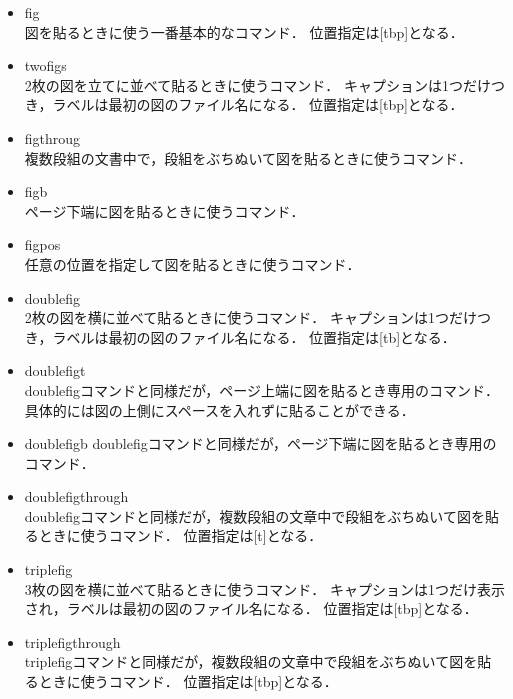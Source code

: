 \begin{itemize}
\item fig\\
  図を貼るときに使う一番基本的なコマンド．
  位置指定は[tbp]となる．
  
\item twofigs\\
  2枚の図を立てに並べて貼るときに使うコマンド．
  キャプションは1つだけつき，ラベルは最初の図のファイル名になる．
  位置指定は[tbp]となる．
  
\item figthroug\\
  複数段組の文書中で，段組をぶちぬいて図を貼るときに使うコマンド．
  
\item figb\\
  ページ下端に図を貼るときに使うコマンド．
  
\item figpos\\
  任意の位置を指定して図を貼るときに使うコマンド．
  
\item doublefig\\
  2枚の図を横に並べて貼るときに使うコマンド．
  キャプションは1つだけつき，ラベルは最初の図のファイル名になる．
  位置指定は[tb]となる．
  
\item doublefigt\\
  doublefigコマンドと同様だが，ページ上端に図を貼るとき専用のコマンド．
  具体的には図の上側にスペースを入れずに貼ることができる．
  
\item doublefigb
  doublefigコマンドと同様だが，ページ下端に図を貼るとき専用のコマンド．
  
\item doublefigthrough\\
  doublefigコマンドと同様だが，複数段組の文章中で段組をぶちぬいて図を貼るときに使うコマンド．
  位置指定は[t]となる．
  
\item triplefig\\
  3枚の図を横に並べて貼るときに使うコマンド．
  キャプションは1つだけ表示され，ラベルは最初の図のファイル名になる．
  位置指定は[tbp]となる．
  
\item triplefigthrough\\
  triplefigコマンドと同様だが，複数段組の文章中で段組をぶちぬいて図を貼るときに使うコマンド．
  位置指定は[tbp]となる．
  
\end{itemize}


